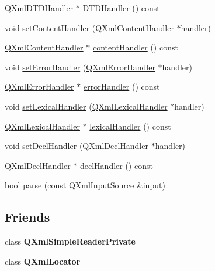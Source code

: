 \begin{DoxyCompactItemize}
\item 
\mbox{\hyperlink{class_q_xml_d_t_d_handler}{Q\+Xml\+D\+T\+D\+Handler}} $\ast$ \mbox{\hyperlink{class_q_xml_simple_reader_ad75f6836c8472e6951ae83341439e89e}{D\+T\+D\+Handler}} () const
\item 
void \mbox{\hyperlink{class_q_xml_simple_reader_ae3561b9c7507e03b87534f505fec2857}{set\+Content\+Handler}} (\mbox{\hyperlink{class_q_xml_content_handler}{Q\+Xml\+Content\+Handler}} $\ast$handler)
\item 
\mbox{\hyperlink{class_q_xml_content_handler}{Q\+Xml\+Content\+Handler}} $\ast$ \mbox{\hyperlink{class_q_xml_simple_reader_ad2c6d2fd753e261308e7171e25a40d37}{content\+Handler}} () const
\item 
void \mbox{\hyperlink{class_q_xml_simple_reader_a2c660f128d0820723138e4e0af5b9dcb}{set\+Error\+Handler}} (\mbox{\hyperlink{class_q_xml_error_handler}{Q\+Xml\+Error\+Handler}} $\ast$handler)
\item 
\mbox{\hyperlink{class_q_xml_error_handler}{Q\+Xml\+Error\+Handler}} $\ast$ \mbox{\hyperlink{class_q_xml_simple_reader_ab490598616bb52328fcc0b78afca6a5f}{error\+Handler}} () const
\item 
void \mbox{\hyperlink{class_q_xml_simple_reader_ad8788962913e2eaeaf18a8124fb1b770}{set\+Lexical\+Handler}} (\mbox{\hyperlink{class_q_xml_lexical_handler}{Q\+Xml\+Lexical\+Handler}} $\ast$handler)
\item 
\mbox{\hyperlink{class_q_xml_lexical_handler}{Q\+Xml\+Lexical\+Handler}} $\ast$ \mbox{\hyperlink{class_q_xml_simple_reader_a56cc7b748fc84448423a1d768e42befd}{lexical\+Handler}} () const
\item 
void \mbox{\hyperlink{class_q_xml_simple_reader_ace5ca778d4b51af1883a8d72a99fb436}{set\+Decl\+Handler}} (\mbox{\hyperlink{class_q_xml_decl_handler}{Q\+Xml\+Decl\+Handler}} $\ast$handler)
\item 
\mbox{\hyperlink{class_q_xml_decl_handler}{Q\+Xml\+Decl\+Handler}} $\ast$ \mbox{\hyperlink{class_q_xml_simple_reader_abf978e05e6844e5eaa983eeb39581b16}{decl\+Handler}} () const
\item 
bool \mbox{\hyperlink{class_q_xml_simple_reader_a664631907374b7d0f7b492ef65f418d9}{parse}} (const \mbox{\hyperlink{class_q_xml_input_source}{Q\+Xml\+Input\+Source}} \&input)
\end{DoxyCompactItemize}
\subsection*{Friends}
\begin{DoxyCompactItemize}
\item 
\mbox{\label{class_q_xml_simple_reader_a2ff4a58652c4931df003d69975caa9f2}} 
class {\bfseries Q\+Xml\+Simple\+Reader\+Private}
\item 
\mbox{\label{class_q_xml_simple_reader_a719c6d0688866ca5c61250f04fc80ca9}} 
class {\bfseries Q\+Xml\+Locator}
\end{DoxyCompactItemize}


